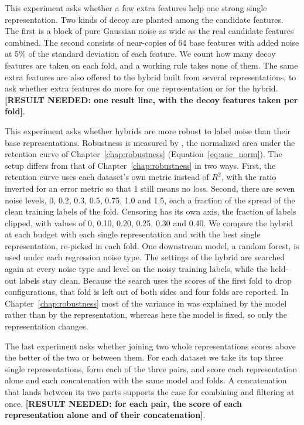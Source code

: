 This experiment asks whether a few extra features help one strong single representation. Two kinds of decoy are planted among the candidate features. The first is a block of pure Gaussian noise as wide as the real candidate features combined. The second consists of near-copies of 64 base features with added noise at 5\% of the standard deviation of each feature. We count how many decoy features are taken on each fold, and a working rule takes none of them. The same extra features are also offered to the hybrid built from several representations, to ask whether extra features do more for one representation or for the hybrid. \textbf{[RESULT NEEDED: one result line, with the decoy features taken per fold]}.

This experiment asks whether hybrids are more robust to label noise than their base representations. Robustness is measured by \aucnorm, the normalized area under the retention curve of Chapter~\ref{chap:robustness} (Equation~\ref{eq:auc_norm}). The setup differs from that of Chapter~\ref{chap:robustness} in two ways. First, the retention curve uses each dataset's own metric instead of $R^2$, with the ratio inverted for an error metric so that 1 still means no loss. Second, there are seven noise levels, 0, 0.2, 0.3, 0.5, 0.75, 1.0 and 1.5, each a fraction of the spread of the clean training labels of the fold. Censoring has its own axis, the fraction of labels clipped, with values of 0, 0.10, 0.20, 0.25, 0.30 and 0.40. We compare the hybrid at each budget with each single representation and with the best single representation, re-picked in each fold. One downstream model, a random forest, is used under each regression noise type. The settings of the hybrid are searched again at every noise type and level on the noisy training labels, while the held-out labels stay clean. Because the search uses the scores of the first fold to drop configurations, that fold is left out of both sides and four folds are reported. In Chapter~\ref{chap:robustness} most of the variance in \aucnorm was explained by the model rather than by the representation, whereas here the model is fixed, so only the representation changes.

The last experiment asks whether joining two whole representations scores above the better of the two or between them. For each dataset we take its top three single representations, form each of the three pairs, and score each representation alone and each concatenation with the same model and folds. A concatenation that lands between its two parts supports the case for combining and filtering at once. \textbf{[RESULT NEEDED: for each pair, the score of each representation alone and of their concatenation]}.


